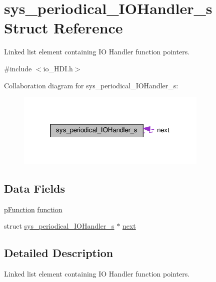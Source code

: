 \hypertarget{structsys__periodical__IOHandler__s}{}\section{sys\+\_\+periodical\+\_\+\+I\+O\+Handler\+\_\+s Struct Reference}
\label{structsys__periodical__IOHandler__s}


Linked list element containing I\+O Handler function pointers.  




{\ttfamily \#include $<$io\+\_\+\+H\+D\+I.\+h$>$}



Collaboration diagram for sys\+\_\+periodical\+\_\+\+I\+O\+Handler\+\_\+s\+:\nopagebreak
\begin{figure}[H]
\begin{center}
\leavevmode
\includegraphics[width=259pt]{db/d16/structsys__periodical__IOHandler__s__coll__graph}
\end{center}
\end{figure}
\subsection*{Data Fields}
\begin{DoxyCompactItemize}
\item 
\hyperlink{definitions_8h_aed53e618f2025481fbe48a5098f70079}{p\+Function} \hyperlink{structsys__periodical__IOHandler__s_af22c738940f827dc20853e9e0edc0a56}{function}
\item 
struct \hyperlink{structsys__periodical__IOHandler__s}{sys\+\_\+periodical\+\_\+\+I\+O\+Handler\+\_\+s} $\ast$ \hyperlink{structsys__periodical__IOHandler__s_a36ad85ffbae299cfa418f69b6f2d745e}{next}
\end{DoxyCompactItemize}


\subsection{Detailed Description}
Linked list element containing I\+O Handler function pointers. 

